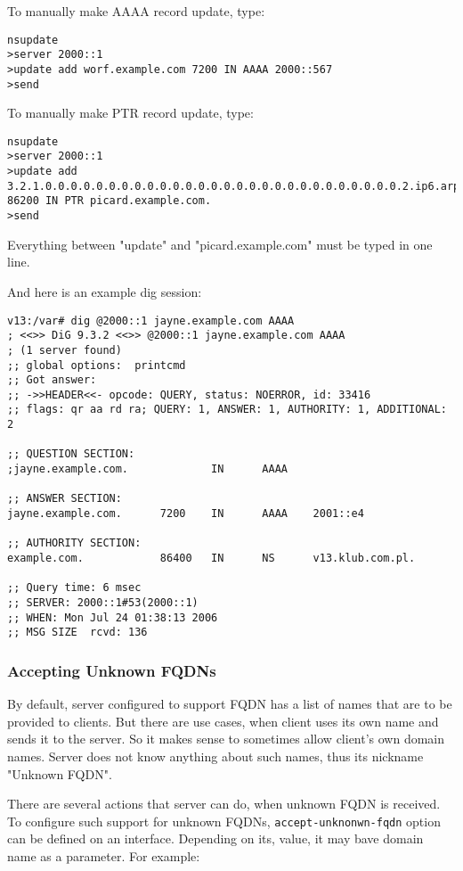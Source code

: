 
To manually make AAAA record update, type:
\begin{lstlisting}
nsupdate
>server 2000::1
>update add worf.example.com 7200 IN AAAA 2000::567
>send
\end{lstlisting}

To manually make PTR record update, type:
\begin{lstlisting}
nsupdate
>server 2000::1
>update add
3.2.1.0.0.0.0.0.0.0.0.0.0.0.0.0.0.0.0.0.0.0.0.0.0.0.0.0.0.0.0.2.ip6.arpa.
86200 IN PTR picard.example.com.
>send
\end{lstlisting}

\Note Everything between "update" and "picard.example.com" must be typed in one line.

And here is an example dig session:

\begin{lstlisting}
v13:/var# dig @2000::1 jayne.example.com AAAA
; <<>> DiG 9.3.2 <<>> @2000::1 jayne.example.com AAAA
; (1 server found)
;; global options:  printcmd
;; Got answer:
;; ->>HEADER<<- opcode: QUERY, status: NOERROR, id: 33416
;; flags: qr aa rd ra; QUERY: 1, ANSWER: 1, AUTHORITY: 1, ADDITIONAL: 2

;; QUESTION SECTION:
;jayne.example.com.             IN      AAAA

;; ANSWER SECTION:
jayne.example.com.      7200    IN      AAAA    2001::e4

;; AUTHORITY SECTION:
example.com.            86400   IN      NS      v13.klub.com.pl.

;; Query time: 6 msec
;; SERVER: 2000::1#53(2000::1)
;; WHEN: Mon Jul 24 01:38:13 2006
;; MSG SIZE  rcvd: 136
\end{lstlisting}

\subsubsection{Accepting Unknown FQDNs}
By default, server configured to support FQDN has a list of names that
are to be provided to clients. But there are use cases, when client
uses its own name and sends it to the server. So it makes sense to
sometimes allow client's own domain names. Server does not know
anything about such names, thus its nickname "Unknown FQDN".

There are several actions that server can do, when unknown FQDN is
received. To configure such support for unknown FQDNs,
\verb+accept-unknonwn-fqdn+ option can be defined on an
interface. Depending on its, value, it may bave domain name as a parameter.
For example:

